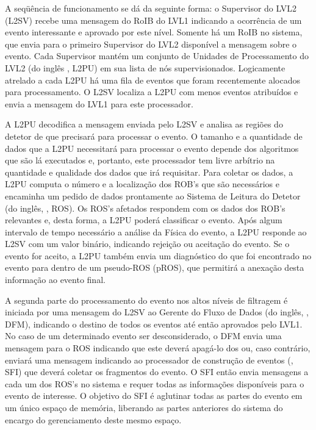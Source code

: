 A seqüência de funcionamento se dá da seguinte forma: o Supervisor do LVL2
(L2SV) recebe uma mensagem do RoIB do LVL1 indicando a ocorrência de um evento
interessante e aprovado por este nível. Somente há um RoIB no sistema, que
envia para o primeiro Supervisor do LVL2 disponível a mensagem sobre o
evento. Cada Supervisor mantém um conjunto de Unidades de Processamento do
LVL2 (do inglês , L2PU) em sua lista de nós
supervisionados. Logicamente atrelado a cada L2PU há uma fila de eventos que
foram recentemente alocados para processamento. O L2SV localiza a L2PU com
menos eventos atribuídos e envia a mensagem do LVL1 para este processador.

A L2PU decodifica a mensagem enviada pelo L2SV e analisa as regiões do detetor
de que precisará para processar o evento. O tamanho e a quantidade de dados
que a L2PU necessitará para processar o evento depende dos algoritmos que são
lá executados e, portanto, este processador tem livre arbítrio na quantidade e
qualidade dos dados que irá requisitar. Para coletar os dados, a L2PU computa
o número e a localização dos ROB's que são necessários e encaminha um pedido
de dados prontamente ao Sistema de Leitura do Detetor (do inglês, , ROS). Os ROS's afetados respondem com os dados dos ROB's
relevantes e, desta forma, a L2PU poderá classificar o evento. Após algum
intervalo de tempo necessário a análise da Física do evento, a L2PU responde
ao L2SV com um valor binário, indicando rejeição ou aceitação do evento. Se o
evento for aceito, a L2PU também envia um diagnóstico do que foi encontrado no
evento para dentro de um pseudo-ROS (pROS), que permitirá a anexação desta
informação ao evento final.

A segunda parte do processamento do evento nos altos níveis de filtragem é
iniciada por uma mensagem do L2SV ao Gerente do Fluxo de Dados (do inglês,
, DFM), indicando o destino de todos os eventos até
então aprovados pelo LVL1. No caso de um determinado evento ser
desconsiderado, o DFM envia uma mensagem para o ROS indicando que este deverá
apagá-lo dos  ou, caso contrário, enviará uma mensagem indicando
ao processador de construção de eventos (, SFI) que deverá
coletar os fragmentos do evento. O SFI então envia mensagens a cada um dos
ROS's no sistema e requer todas as informações disponíveis para o evento de
interesse. O objetivo do SFI é aglutinar todas as partes do evento em um único
espaço de memória, liberando as partes anteriores do sistema do encargo do
gerenciamento deste mesmo espaço.

